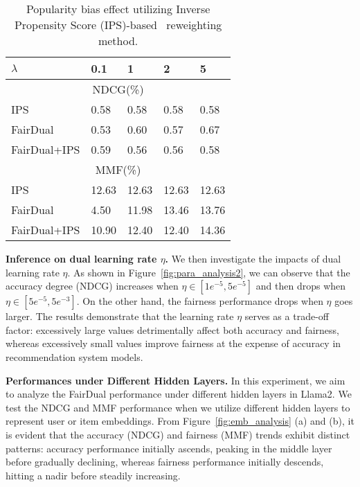 \begin{table}[t]
\centering
\caption{Popularity bias effect utilizing Inverse Propensity Score (IPS)-based~\cite{xu2022dually} reweighting method.}
\label{tab:pop_bias}
\begin{tabular}{lllll}
\toprule
$\lambda$  &  0.1  & 1  & 2 & 5 \\ \midrule
\multicolumn{5}{c}{NDCG(\%)} \\
\midrule
 IPS & 0.58 & 0.58 & 0.58 & 0.58 \\
 FairDual & 0.53 & 0.60 & 0.57 & 0.67 \\ 
 FairDual+IPS & 0.59 & 0.56 & 0.56 & 0.58 \\ 
 \midrule
\multicolumn{5}{c}{MMF(\%)} \\
\midrule
 IPS & 12.63 & 12.63 & 12.63 & 12.63 \\
 FairDual & 4.50 & 11.98 & 13.46 & 13.76 \\
 FairDual+IPS & 10.90 & 12.40 & 12.40 & 14.36 \\ 
\bottomrule
\end{tabular}
\end{table}

\textbf{Inference on dual learning rate $\eta$.} We then investigate the impacts of dual learning rate $\eta$. As shown in Figure~\ref{fig:para_analysis2}, we can observe that the accuracy degree (NDCG) increases when $\eta\in [1e^{-5}, 5e^{-5}]$ and then drops when $\eta\in [5e^{-5}, 5e^{-3}]$. On the other hand, the fairness performance drops when $\eta$ goes larger.
The results demonstrate that the learning rate $\eta$ serves as a trade-off factor: excessively large values detrimentally affect both accuracy and fairness, whereas excessively small values improve fairness at the expense of accuracy in recommendation system models.


\textbf{Performances under Different Hidden Layers.} In this experiment, we aim to analyze the FairDual performance under different hidden layers in Llama2. We test the NDCG and MMF performance when we utilize different hidden layers to represent user or item embeddings. 
From Figure~\ref{fig:emb_analysis} (a) and (b), it is evident that the accuracy (NDCG) and fairness (MMF) trends exhibit distinct patterns: accuracy performance initially ascends, peaking in the middle layer before gradually declining, whereas fairness performance initially descends, hitting a nadir before steadily increasing. 


